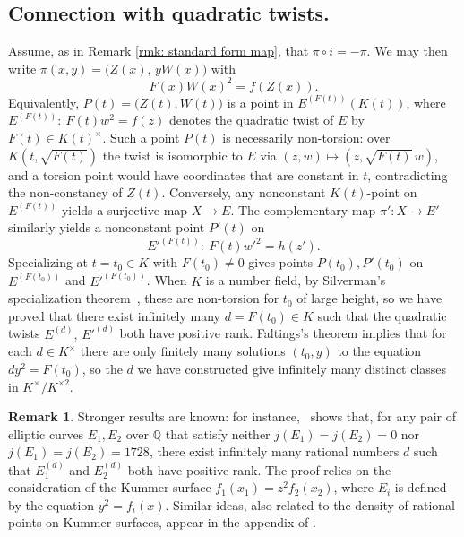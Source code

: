\documentclass[a4paper,twoside,english]{amsart}
\theoremstyle{plain}
\theoremstyle{definition}
\newtheorem{remark}[theorem]{Remark}
\begin{document}
\subsection{Connection with quadratic twists.}
Assume, as in Remark \ref{rmk: standard form map}, that $\pi\circ i=-\pi$. We may then write $\pi(x,y)=\bigl(Z(x),\,yW(x)\bigr)$ with
\[
F(x)W(x)^2 = f(Z(x)).
\]
Equivalently, $P(t)=\bigl(Z(t),W(t)\bigr)$ is a point in $E^{(F(t))}(K(t))$, where
$E^{(F(t))}:\ F(t)w^2=f(z)$ denotes the quadratic twist of $E$ by $F(t) \in K(t)^\times$. 
Such a point $P(t)$ is necessarily non-torsion: over $K(t,\sqrt{F(t)})$ the twist is isomorphic to $E$ via $(z,w)\mapsto (z,\sqrt{F(t)}\,w)$, and a torsion point would have coordinates that are constant in $t$, contradicting the non-constancy of $Z(t)$. Conversely, any nonconstant $K(t)$-point on $E^{(F(t))}$ yields a surjective map $X\to E$.
The complementary map $\pi' : X \to E'$ similarly yields a nonconstant point $P'(t)$ on
\[
E'^{(F(t))}:\ F(t){w'}^2=h(z').
\]
Specializing at $t=t_0\in K$ with $F(t_0)\neq 0$ gives points $P(t_0), P'(t_0)$ on $E^{(F(t_0))}$ and $E'^{(F(t_0))}$. When $K$ is a number field, by Silverman's specialization theorem~\cite{SilvermanSpecialization}, these are non-torsion for $t_0$ of large height, so we have proved that there exist infinitely many $d=F(t_0) \in K$ such that the quadratic twists $E^{(d)},\, E'^{(d)}$ both have positive rank. Faltings's theorem implies that for each $d \in K^\times$ there are only finitely many solutions $(t_0, y)$ to the equation $dy^2=F(t_0)$, so the $d$ we have constructed give infinitely many distinct classes in $K^\times / K^{\times 2}$.

\begin{remark}
    Stronger results are known: for instance,~\cite[Theorem 4]{MR1214702} shows that, for any pair of elliptic curves $E_1, E_2$ over $\mathbb{Q}$ that satisfy neither $j(E_1)=j(E_2)=0$ nor $j(E_1)=j(E_2)=1728$, there exist infinitely many rational numbers $d$ such that $E_1^{(d)}$ and $E_2^{(d)}$ both have positive rank. The proof relies on the consideration of the Kummer surface $f_1(x_1)=z^2 f_2(x_2)$, where $E_i$ is defined by the equation $y^2 = f_i(x)$. Similar ideas, also related to the density of rational points on Kummer surfaces, appear in the appendix of \cite{MR3648511}.
\end{remark}
\end{document}
